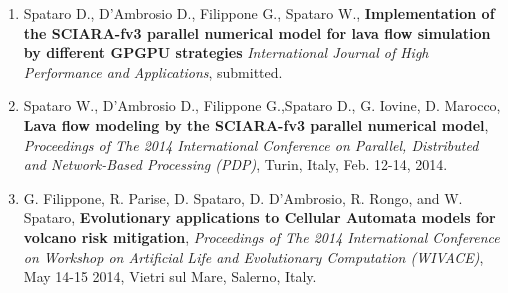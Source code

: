   \begin{enumerate}
    \item Spataro D., D'Ambrosio D., Filippone G., Spataro W., \textbf{Implementation of the SCIARA-fv3
    parallel numerical model for lava flow simulation by different GPGPU strategies} \emph{International Journal of High Performance and Applications}, submitted.
		\item Spataro W., D'Ambrosio D., Filippone G.,Spataro D., G.
    Iovine, D. Marocco, \textbf{Lava flow modeling by the SCIARA-fv3
    parallel numerical model}, \emph{Proceedings of The 2014 International
    Conference on Parallel, Distributed and Network-Based Processing (PDP)}, Turin, Italy, Feb. 12-14,
    2014.
    \item G. Filippone, R. Parise, D. Spataro,
	D. D’Ambrosio, R. Rongo, and W. Spataro, \textbf{Evolutionary
	applications to Cellular Automata models for volcano risk mitigation},
	\emph{Proceedings of The 2014 International Conference on Workshop on Artificial Life and
	Evolutionary Computation (WIVACE)}, May 14-15 2014, Vietri sul Mare, Salerno,
	Italy.
   
  \end{enumerate}
  
